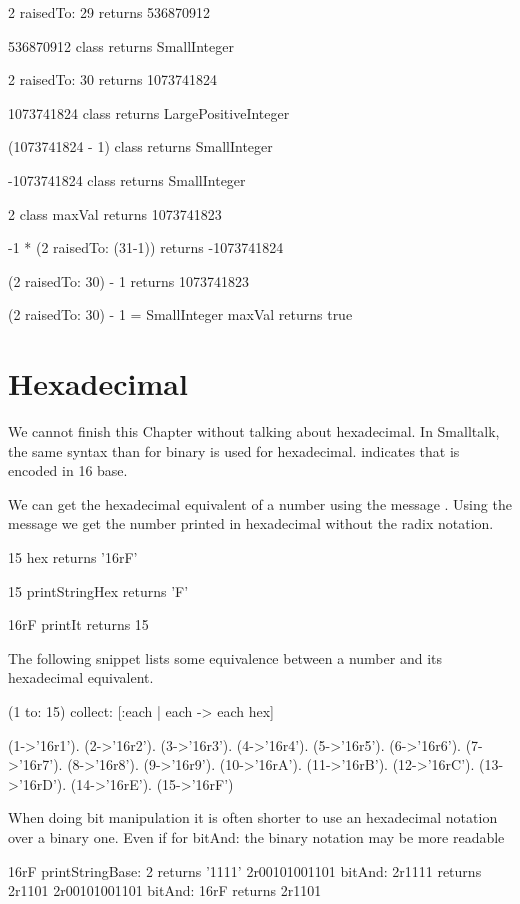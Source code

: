\documentclass[a4paper,10pt,twoside]{book}
\begin{document}
\begin{code}{}
2 raisedTo: 29 
	returns 536870912 

536870912 class
	returns SmallInteger

2 raisedTo: 30 
	returns 1073741824

1073741824 class
	returns LargePositiveInteger
	
(1073741824 - 1) class
	returns SmallInteger

-1073741824 class 
	returns SmallInteger

2 class maxVal 
	returns 1073741823

-1 * (2 raisedTo: (31-1)) 
	returns -1073741824
	
(2 raisedTo: 30) - 1
	returns 1073741823
	
(2 raisedTo: 30) - 1 = SmallInteger maxVal	
	returns true
\end{code}

\section{Hexadecimal}
We cannot finish this Chapter without talking about hexadecimal. In Smalltalk, the same syntax than for binary is used for hexadecimal.  indicates that  is encoded in 16 base. 

We can get the hexadecimal equivalent of a number using the message . 
Using the message  we get the number printed in hexadecimal without the radix notation. 

\begin{code}{}
15 hex
	returns '16rF'
	
15 printStringHex 
	returns 'F'

16rF printIt
	returns 15
\end{code}

The following snippet lists some equivalence between a number and its hexadecimal equivalent.
\begin{code}
(1 to: 15) collect: [:each | each -> each hex] 

{(1->'16r1'). (2->'16r2'). (3->'16r3'). (4->'16r4'). (5->'16r5'). (6->'16r6'). (7->'16r7'). (8->'16r8'). (9->'16r9'). (10->'16rA'). (11->'16rB'). (12->'16rC'). (13->'16rD'). (14->'16rE'). (15->'16rF')}
\end{code}

When doing bit manipulation it is often shorter to use an hexadecimal notation over a binary one. Even if for bitAnd: the binary notation may be more readable
\begin{code}{}
16rF printStringBase: 2
	returns '1111'
2r00101001101 bitAnd: 2r1111	
	returns 2r1101
2r00101001101 bitAnd: 16rF
	returns 2r1101
\end{code}
\end{document}
